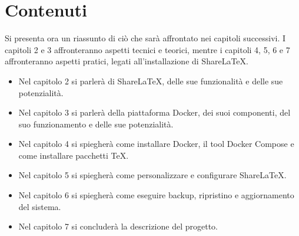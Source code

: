 \section{Contenuti}
Si presenta ora un riassunto di ciò che sarà affrontato nei capitoli successivi. I capitoli 2 e 3 affronteranno aspetti tecnici e teorici, mentre i capitoli 4, 5, 6 e 7 affronteranno aspetti pratici, legati all'installazione di ShareLaTeX.
\begin{itemize}
    \item Nel capitolo 2 si parlerà di ShareLaTeX, delle sue funzionalità e delle sue potenzialità.
    \item Nel capitolo 3 si parlerà della piattaforma Docker, dei suoi componenti, del suo funzionamento e delle sue potenzialità.
    \item Nel capitolo 4 si spiegherà come installare Docker, il tool Docker Compose e come installare pacchetti \TeX.
    \item Nel capitolo 5 si spiegherà come personalizzare e configurare ShareLaTeX.
    \item Nel capitolo 6 si spiegherà come eseguire backup, ripristino e aggiornamento del sistema.
    \item Nel capitolo 7 si concluderà la descrizione del progetto.
\end{itemize}